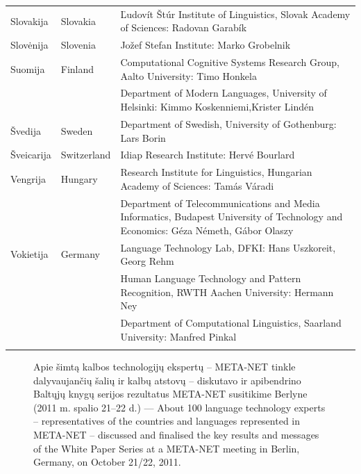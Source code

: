 \begin{longtable}{llp{105mm}}
  Slovakija & \textcolor{grey1}{Slovakia} &  Ľudovít Štúr Institute of Linguistics, Slovak Academy of Sciences: Radovan Garabík \\ \addlinespace
   
  Slovėnija & \textcolor{grey1}{Slovenia} & Jožef Stefan Institute: Marko Grobelnik \\ \addlinespace
   
 Suomija & \textcolor{grey1}{Finland} & Computational Cognitive Systems Research Group, Aalto University: Timo Honkela\\ \addlinespace
  & & Department of Modern Languages, University of Helsinki: Kimmo Koskenniemi,\newline Krister Lindén \\ \addlinespace
  
  Švedija & \textcolor{grey1}{Sweden} & Department of Swedish, University of Gothenburg: Lars Borin \\ \addlinespace
   
  Šveicarija & \textcolor{grey1}{Switzerland} & Idiap Research Institute: Hervé Bourlard \\ \addlinespace 
   
  Vengrija & \textcolor{grey1}{Hungary} & Research Institute for Linguistics, Hungarian Academy of Sciences: Tamás Váradi\\  \addlinespace
  & & Department of Telecommunications and Media Informatics, Budapest University of Technology and Economics: Géza Németh, Gábor Olaszy\\ \addlinespace
  
  Vokietija & \textcolor{grey1}{Germany} & Language Technology Lab, DFKI: Hans Uszkoreit, Georg Rehm\\ \addlinespace
  & & Human Language Technology and Pattern Recognition, RWTH Aachen University: Hermann Ney \\ \addlinespace
  & & Department of Computational Linguistics, Saarland University: Manfred Pinkal\\ \addlinespace
\end{longtable}
\normalsize

\renewcommand*{\figureformat}{}
\renewcommand*{\captionformat}{}

\begin{figure}[htbp]
  \center
  \caption{Apie šimtą kalbos technologijų ekspertų -- META-NET tinkle dalyvaujančių šalių ir kalbų atstovų -- diskutavo ir apibendrino Baltųjų knygų serijos rezultatus META-NET susitikime Berlyne (2011 m. spalio 21–22 d.) --- \textcolor{grey1}{About 100 language technology experts -- representatives of the countries and languages represented in META-NET -- discussed and finalised the key results and messages of the White Paper Series at a META-NET meeting in Berlin, Germany, on October 21/22, 2011.}}
  \medskip
\end{figure}

